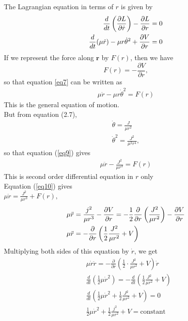 The Lagrangian equation in terms of $r$ is given by
\begin{align}
\frac{d}{d t}\left(\frac{\partial L}{\partial \dot{r}}\right)-\frac{\partial L}{\partial r}=0 \notag\\
\frac{d}{d t}(\mu \dot{r})-\mu r \dot{\theta}^{2}+\frac{\partial V}{\partial r}=0\label{eq7}
\end{align}
If we represent the force along $\mathbf{r}$ by $F(r)$, then we have
$$
F(r)=-\frac{\partial V}{\partial r},
$$
so that equation \ref{eq7} can be written as
\begin{align}
\mu \ddot{r}-\mu r \dot{\theta}^{2}=F(r) \label{eq9}
\end{align}
This is the general equation of motion.\\
 But from equation (2.7),
 \begin{align*}
  \dot{\theta}=\frac{J}{\mu r^{2}}\\
 \dot{\theta}^{2}=\frac{J^{2}}{\mu^{2} r^{4}},
 \end{align*}
so that equation (\ref{eq9}) gives
\begin{align}
\mu \ddot{r}-\frac{J^{2}}{\mu r^{3}}=F(r) \label{eq10}
\end{align}
This is second order differential equation in $r$ only\\
 Equation (\ref{eq10}) gives\\
$
\mu \ddot{r}=\frac{J^{2}}{\mu r^{3}}+F(r),
$
\begin{align}
	&\mu \ddot{r}=\frac{j^{2}}{\mu r^{3}}-\frac{\partial V}{\partial r}=-\frac{1}{2} \frac{\partial}{\partial r}\left(\frac{J^{2}}{\mu r^{2}}\right)-\frac{\partial V}{\partial r} \notag \\
	&\mu \ddot{r}=-\frac{\partial}{\partial r}\left(\frac{1}{2} \frac{J^{2}}{\mu r^{2}}+V\right) \label{eq11}
\end{align}
Multiplying both sides of this equation by $\dot{r}$, we get
\begin{align*}
&\mu \dot{r} \ddot{r}=-\frac{\partial}{\partial r}\left(\frac{1}{2} \cdot \frac{J^{2}}{\mu r^{2}}+V\right) \dot{r} \\
&\frac{d}{d t}\left(\frac{1}{2} \mu \dot{r}^{2}\right)=-\frac{d}{d t}\left(\frac{1}{2} \frac{J^{2}}{\mu r^{2}}+V\right) \\
&\frac{d}{d t}\left(\frac{1}{2} \mu \dot{r}^{2}+\frac{1}{2} \frac{J^{2}}{\mu r^{2}}+V\right)=0 \\
&\frac{1}{2} \mu \dot{r}^{2}+\frac{1}{2} \frac{j^{2}}{\mu r^{2}}+V=\mathrm{constant}
\end{align*}
